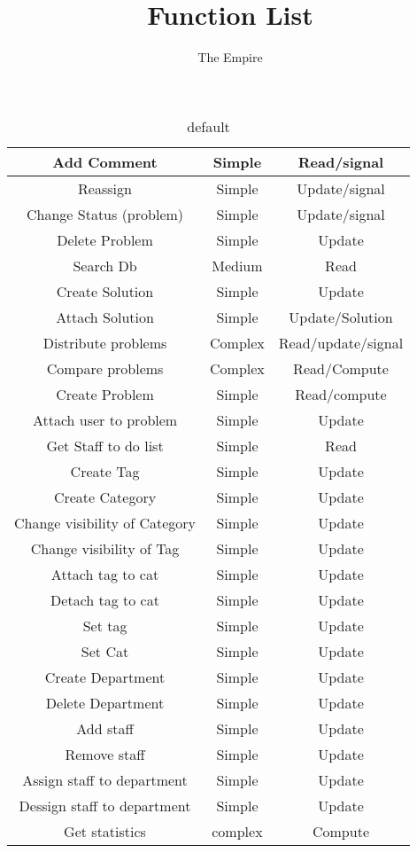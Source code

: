 \documentclass[11pt]{amsart}
\title{Function List}
\author{The Empire}
\begin{document}
\maketitle

\begin{table}[htdp]
\caption{default}
\begin{center}
\begin{tabular}{|c|c|c|}
\hline
Add Comment &   Simple & Read/signal   \\ \hline%
Reassign & Simple   & Update/signal \\ \hline%
Change Status (problem) &   Simple & Update/signal \\ \hline%
Delete Problem & Simple &   Update \\   \hline%
Search Db & Medium &   Read \\ \hline%
Create Solution & Simple &   Update \\   \hline%
Attach Solution & Simple &   Update/Solution \\   \hline%
Distribute problems &   Complex & Read/update/signal \\   \hline%
Compare problems & Complex & Read/Compute \\ \hline%
Create Problem &   Simple & Read/compute \\   \hline%
Attach user to problem & Simple & Update \\ \hline%
Get Staff to do list & Simple & Read \\   \hline%
Create Tag & Simple &   Update \\ \hline%
Create Category & Simple & Update \\ \hline%
Change visibility of Category &   Simple &   Update \\   \hline%
Change visibility of Tag &   Simple &  Update \\ \hline%
Attach tag to cat & Simple & Update \\ \hline%
Detach tag to cat & Simple & Update \\ \hline%
Set tag & Simple & Update \\ \hline%
Set Cat & Simple & Update \\ \hline%
Create Department & Simple & Update \\ \hline%
Delete Department & Simple & Update \\ \hline%
Add staff & Simple & Update \\ \hline%
Remove staff & Simple & Update \\ \hline%
Assign staff to department & Simple & Update \\ \hline%
Dessign staff to department & Simple & Update \\ \hline%
Get statistics & complex & Compute \\ \hline%

\end{tabular}
\end{center}
\label{default}
\end{table}%
\end{document}
